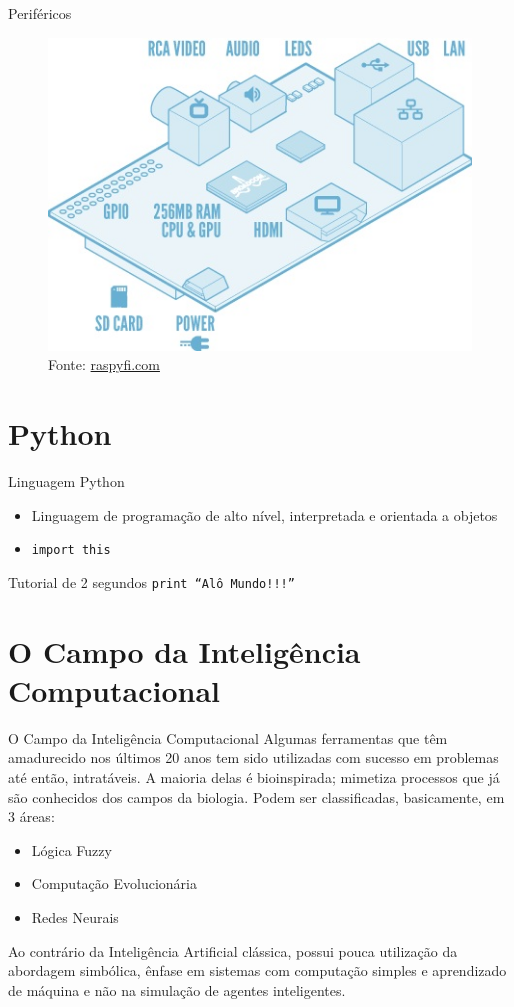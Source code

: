 \documentclass{beamer}
\begin{document}
    \begin{frame}{Periféricos}
      \begin{figure}[htpb]
	\includegraphics[scale=0.5]{raspberrypi-schematic.jpg}
	\caption{Fonte: \url{raspyfi.com}}
      \end{figure}
    \end{frame}
  \section{Python}
    \frame{\sectionpage}
    
    \begin{frame}{Linguagem Python}
      \begin{itemize}
	\item Linguagem de programação de alto nível, interpretada e orientada a objetos
	\item \texttt{import this}
      \end{itemize}      
    \end{frame}

    \begin{frame}{Tutorial de 2 segundos}
      \texttt{print ``Alô Mundo!!!''}
    \end{frame}
    
  \section{O Campo da Inteligência Computacional}
    \frame{\sectionpage}
      \begin{frame}{O Campo da Inteligência Computacional} 
	Algumas ferramentas que têm amadurecido nos últimos 20 anos tem sido utilizadas com sucesso em problemas até então, intratáveis. A maioria delas é bioinspirada; mimetiza processos que já são conhecidos dos campos da biologia. Podem ser classificadas, basicamente, em 3 áreas:

	\begin{itemize}
	  \item Lógica Fuzzy
	  \item Computação Evolucionária
	  \item Redes Neurais
	\end{itemize}
	Ao contrário da Inteligência Artificial clássica, possui pouca utilização da abordagem simbólica, ênfase em sistemas com computação simples e aprendizado de máquina e não na simulação de agentes inteligentes.
    \end{frame}
\end{document}
